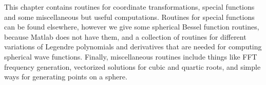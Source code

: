 


This chapter contains routines for coordinate transformations, special functions and some miscellaneous but useful computations. Routines for special functions can be found elsewhere, however we give some spherical Bessel function routines, because Matlab does not have them, and a collection of routines for different variations of Legendre polynomials and derivatives that are needed for computing spherical wave functions. Finally, miscellaneous routines include things like FFT frequency generation, vectorized solutions for cubic and quartic roots, and simple ways for generating points on a sphere. 


\clearpage

\clearpage

\clearpage



